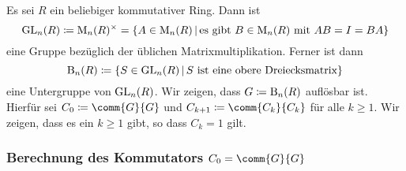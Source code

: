 Es sei $R$ ein beliebiger kommutativer Ring.
Dann ist
\[
            \GL{n}{R}
  \coloneqq \matrices{n}{R}^\times
  =         \{
              A \in \matrices{n}{R}
            \suchthat
              \text{es gibt $B \in \matrices{n}{R}$ mit $AB = I = BA$}
            \}
\]
eine Gruppe bezüglich der üblichen Matrixmultiplikation.
Ferner ist dann
\[
            \Borel{n}{R}
  \coloneqq  \{
              S \in \GL{n}{R}
            \suchthat
              \text{$S$ ist eine obere Dreiecksmatrix}
            \}
\]
eine Untergruppe von $\operatorname{GL}_{n}(R)$.
Wir zeigen, dass $G \coloneqq \operatorname{B}_{n}(R)$ auflösbar ist.
Hierfür sei $C_0 \coloneqq \comm{G}{G}$ und $C_{k+1} \coloneqq \comm{C_k}{C_k}$ für alle $k \geq 1$.
Wir zeigen, dass es ein $k \geq 1$ gibt, so dass $C_k = 1$ gilt.



\subsubsection*{Berechnung des Kommutators $C_0 = \comm{G}{G}$}

